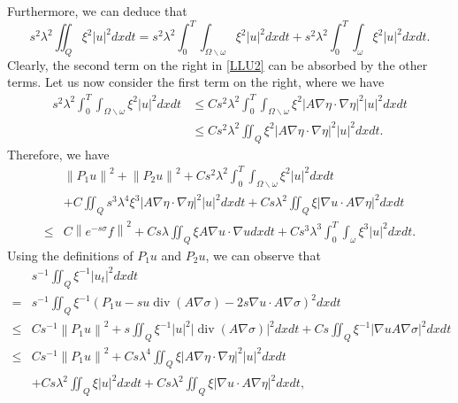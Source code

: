 \documentclass[9pt,reqno]{amsart}
\theoremstyle{plain}
\numberwithin{equation}{section}
\numberwithin{theorem}{section}
\def\Om{\Omega}
\DeclareMathOperator*{\Div}{\mathrm{div}}
\def\Om{\Omega}
\begin{document}
	Furthermore, we can deduce that
	\begin{equation*}
		s^2 \lambda^2 \iint_Q \xi^{2}|u|^2dx  d t=s^2 \lambda^2 \int_0^T \int_{\Om\backslash \omega} \xi^{2}|u|^2dx  d t + s^2 \lambda^2 \int_0^T \int_{\omega} \xi^{2}|u|^2dx  d t.
	\end{equation*}
	Clearly, the second term on the right in \eqref{LLU2} can be absorbed by the other terms. Let us now consider the first term on the right, where we have
	\begin{equation*}
		\begin{split}
			s^2 \lambda^2 \int_0^T \int_{\Om\backslash \omega} \xi^{2}|u|^2dx  d t
			&\le Cs^2 \lambda^2 \int_0^T \int_{\Om\backslash \omega} \xi^{2}\left|A \nabla \eta \cdot \nabla \eta \right|^2|u|^2dx  d t\\
			&\le Cs^2 \lambda^2 \iint_Q \xi^{2}\left|A \nabla \eta \cdot \nabla \eta \right|^2|u|^2dx  d t.
		\end{split}
	\end{equation*}
	Therefore, we have
	\begin{equation}\label{LLU3}
		\begin{split}
			&\left\|P_1 u\right\|^2+\left\|P_2 u\right\|^2+C s^2 \lambda^2 \int_0^T \int_{\Om\backslash \omega} \xi^{2}|u|^2dx  d t\\
			&+  C\iint_Q s^3 \lambda^4 \xi^3\left|A \nabla \eta \cdot \nabla \eta \right|^2|u|^2 dx dt  + C s  \lambda^2 \iint_Q\xi|\nabla u \cdot A \nabla \eta|^2 dx  d t\\
			\leq& C\left\|e^{-s \sigma} f\right\|^2
			+Cs \lambda \iint_Q \xi A \nabla u \cdot \nabla udx  d t+Cs^3 \lambda^3 \int_0^T \int_{\omega} \xi^3|u|^2dx  d t.
		\end{split}
	\end{equation}
	Using the definitions of $P_1 u$ and $P_2 u$, we can observe that
	\begin{equation*}
		\begin{split}
			&s^{-1} \iint_Q \xi^{-1}\left|u_t\right|^2dx  d t\\
			=&s^{-1} \iint_Q \xi^{-1}(P_1 u -s u \Div(A\nabla \sigma)- 2s \nabla u \cdot A\nabla \sigma)^2dx  d t\\
			\le& Cs^{-1}\left\|P_1 u\right\|^2+s   \iint_Q \xi^{-1}|u|^2|\Div(A \nabla \sigma)|^2dx  d t +C s \iint_Q \xi^{-1}|\nabla u A \nabla \sigma|^2dx  d t \\
			\leq& Cs^{-1}\left\|P_1 u\right\|^2+C s \lambda^4 \iint_Q \xi\left| A \nabla \eta \cdot \nabla \eta \right|^2 |u|^2dx  d t \\
			&+C s \lambda^2  \iint_Q \xi|u|^2dx  d t+C s \lambda^2 \iint_Q \xi|\nabla u \cdot A \nabla \eta|^2dx  d t,
		\end{split}
	\end{equation*}
\end{document}
